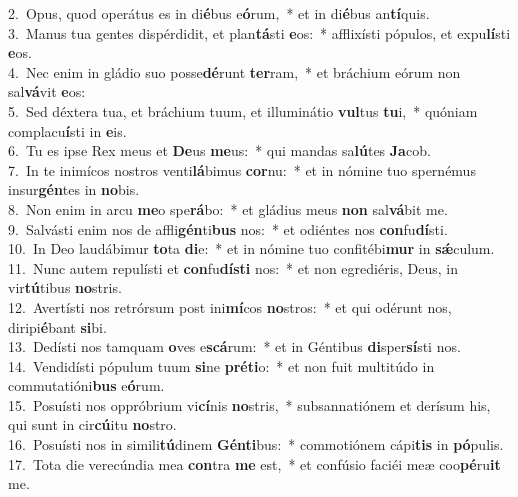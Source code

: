 {2.~}Opus, quod operátus es in di\textbf{é}bus e\textbf{ó}rum,~* et in di\textbf{é}bus an\textbf{tí}quis.\\
{3.~}Manus tua gentes dispérdidit, et plan\textbf{tá}sti \textbf{e}os:~* afflixísti pópulos, et expu\textbf{lí}sti \textbf{e}os.\\
{4.~}Nec enim in gládio suo posse\textbf{dé}runt \textbf{ter}ram,~* et bráchium eórum non sal\textbf{vá}vit \textbf{e}os:\\
{5.~}Sed déxtera tua, et bráchium tuum, et illuminátio \textbf{vul}tus \textbf{tu}i,~* quóniam complacu\textbf{í}sti in \textbf{e}is.\\
{6.~}Tu es ipse Rex meus et \textbf{De}us \textbf{me}us:~* qui mandas sa\textbf{lú}tes \textbf{Ja}cob.\\
{7.~}In te inimícos nostros venti\textbf{lá}bimus \textbf{cor}nu:~* et in nómine tuo spernémus insur\textbf{gén}tes in \textbf{no}bis.\\
{8.~}Non enim in arcu \textbf{me}o spe\textbf{rá}bo:~* et gládius meus \textbf{non} sal\textbf{vá}bit me.\\
{9.~}Salvásti enim nos de affli\textbf{gén}ti\textbf{bus} nos:~* et odiéntes nos \textbf{con}fu\textbf{dí}sti.\\
{10.~}In Deo laudábimur \textbf{to}ta \textbf{di}e:~* et in nómine tuo confitébi\textbf{mur} in \textbf{sǽ}culum.\\
{11.~}Nunc autem repulísti et \textbf{con}fu\textbf{dí}\textbf{sti} nos:~* et non egrediéris, Deus, in vir\textbf{tú}tibus \textbf{no}stris.\\
{12.~}Avertísti nos retrórsum post ini\textbf{mí}cos \textbf{no}stros:~* et qui odérunt nos, diripi\textbf{é}bant \textbf{si}bi.\\
{13.~}Dedísti nos tamquam \textbf{o}ves e\textbf{scá}rum:~* et in Géntibus \textbf{di}sper\textbf{sí}sti nos.\\
{14.~}Vendidísti pópulum tuum \textbf{si}ne \textbf{pré}\textbf{ti}o:~* et non fuit multitúdo in commutatióni\textbf{bus} e\textbf{ó}rum.\\
{15.~}Posuísti nos oppróbrium vi\textbf{cí}nis \textbf{no}stris,~* subsannatiónem et derísum his, qui sunt in cir\textbf{cú}itu \textbf{no}stro.\\
{16.~}Posuísti nos in simili\textbf{tú}dinem \textbf{Gén}\textbf{ti}bus:~* commotiónem cápi\textbf{tis} in \textbf{pó}pulis.\\
{17.~}Tota die verecúndia mea \textbf{con}tra \textbf{me} est,~* et confúsio faciéi meæ coo\textbf{pé}ru\textbf{it} me.\\

